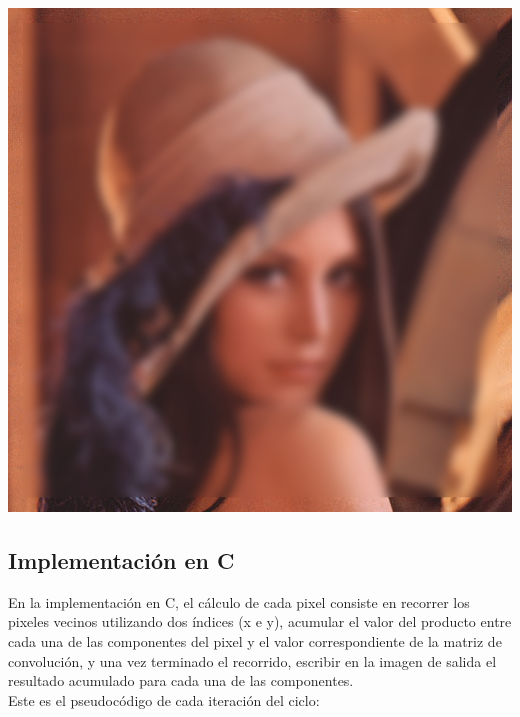 \documentclass[10pt,a4paper,spanish]{article}
\begin{document}
\begin{center}\includegraphics[keepaspectratio]{blur_lena24_5_15.png}\end{center}

\subsection{Implementación en C}

En la implementación en C, el cálculo de cada pixel consiste en recorrer los pixeles vecinos utilizando dos índices (x e y), acumular el valor del producto entre cada una de las componentes del pixel y el valor correspondiente de la matriz de convolución, y una vez terminado el recorrido, escribir en la imagen de salida el resultado acumulado para cada una de las componentes. \\

Este es el pseudocódigo de cada iteración del ciclo:
\end{document}
